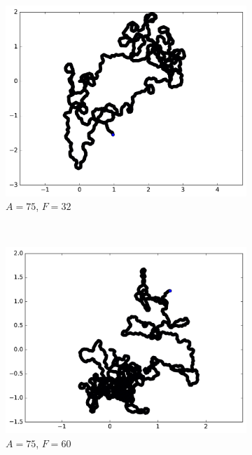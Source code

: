 \begin{figure}[htb]
\begin{subfigure}[t]{\subImgWmo}
			\includegraphics[width=\textwidth]{figures/ch3/synTraj_219_75_32}
			\caption[$A = 75$, $F=32$]{$A = 75$, $F=32$}
			\label{fig:synTraj_219_75_32}
		\end{subfigure}
		~
		\begin{subfigure}[t]{\subImgWmo}
			\centering
			\includegraphics[width=\textwidth]{figures/ch3/synTraj_219_75_60}
			\caption[$A = 75$, $F=60$]{$A = 75$, $F=60$}
			\label{fig:synTraj_219_75_60}
		\end{subfigure}
		~
		\begin{subfigure}[t]{\subImgWmo}
			\centering

\end{subfigure}
\end{figure}
